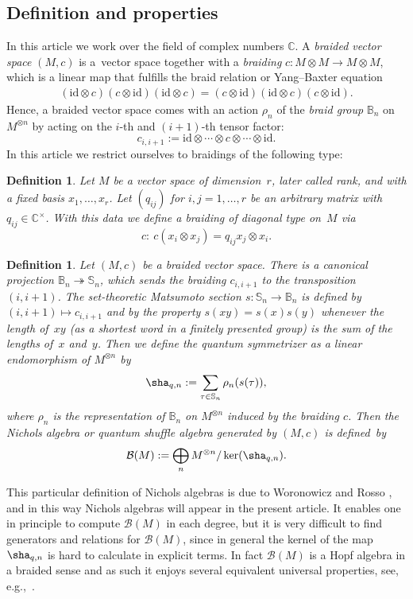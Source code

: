 \documentclass[pdftex]{sigma}%
\numberwithin{equation}{section}
\newtheorem{defin}[teo]{Definition}
\newcommand{\C}{\mathbb{C}}
\newcommand{\cB}{\mathcal{B}}
\begin{document}
\subsection{Definition and properties}
In this article we work over the field of complex numbers $\C$. A \emph{braided vector space} $(M,c)$ is a~vector space together with a \emph{braiding} $c\colon M\otimes M\to M\otimes M$, which is a linear map that fulfills the braid relation or Yang--Baxter equation
\begin{gather*}
(\mathrm{id}\otimes c)(c\otimes \mathrm{id})(\mathrm{id}\otimes c)
=(c\otimes \mathrm{id})(\mathrm{id}\otimes c)(c\otimes \mathrm{id}).\end{gather*}
Hence, a braided vector space comes with an action $\rho_n$ of the \emph{braid group} $\mathbb{B}_n$ on $M^{\otimes n}$ by acting on the $i$-th and $(i+1)$-th tensor factor:
\[c_{i,i+1}:=\mathrm{id}\otimes \cdots \otimes c \otimes \cdots \otimes \mathrm{id}.\]
In this article we restrict ourselves to braidings of the following type:
\begin{defin}
	Let $M$ be a vector space of dimension~$r$, later called \emph{rank}, and with a fixed basis $x_1,\dots, x_r$. Let $(q_{ij})$ for ${i,j=1,\dots, r}$ be an arbitrary matrix with $q_{ij}\in \C^\times$. With this data we define a \emph{braiding of diagonal type} on~$M$ via
	\[c\colon \ c(x_i\otimes x_j)=q_{ij} x_j\otimes x_i.\]
\end{defin}
\begin{defin}\label{def_QuantumSymmetrizer}
 Let $(M, c)$ be a braided vector space. There is a canonical projection $\mathbb{B}_n\twoheadrightarrow \mathbb{S}_n$, which sends the braiding $c_{i,i+1}$ to the transposition~{$(i,i+1)$}. The set-theoretic \emph{Matsumoto section} $s\colon \mathbb{S}_n \rightarrow \mathbb{B}_n$ is defined by $(i,i+1)\mapsto c_{i,i + 1}$ and by the property $s(xy) = s(x)s(y)$ whenever the length of~$xy$ (as a shortest word in a finitely presented group) is the sum of the lengths of~$x$ and~$y$. Then we define the \emph{quantum symmetrizer} as a linear endomorphism of $M^{\otimes n}$ by
\begin{equation*}%
 \sha_{q,n}: =\sum_{\tau\in \mathbb{S}_n} \rho_n(s(\tau)),
\end{equation*}
where $\rho_n$ is the representation of $\mathbb{B}_n$ on $M^{\otimes n}$ induced by the braiding $c$.
Then the \emph{Nichols algebra} or \emph{quantum shuffle algebra} generated by $(M,c)$ is defined~by
\[\cB(M) :=\bigoplus _{n} M^{\otimes n}/ \operatorname{ker} (\sha_{q,n}).\]
\end{defin}
This particular definition of Nichols algebras is due to Woronowicz \cite{Wor89} and Rosso \cite{Rosso98}, and in this way Nichols algebras will appear in the present article. It enables one in principle to compute $\mathcal{B}(M)$ in each degree, but it is very difficult to find generators and relations for $\mathcal{B}(M)$, since in general the kernel of the map $\sha_{q,n}$ is hard to calculate in explicit terms.
In fact $\cB(M)$ is a Hopf algebra in a braided sense and as such it enjoys several equivalent universal properties, see, e.g.,~\cite[Chapters 1 and~7]{HS20}.
\end{document}
